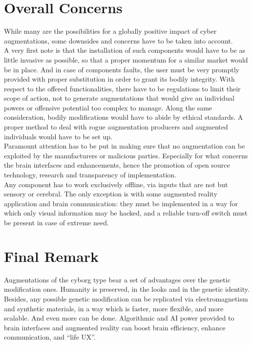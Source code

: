 \section*{Overall Concerns}
\label{sec:concerns}

While many are the possibilities for a globally positive impact of cyber augmentations, some downsides and concerns have to be taken into account.\\

A very first note is that the installation of such components would have to be as little invasive as possible, so that a proper momentum for a similar market would be in place. And in case of components faults, the user must be very promptly provided with proper substitution in order to grant its bodily integrity. With respect to the offered functionalities, there have to be regulations to limit their scope of action, not to generate augmentations that would give an individual powers or offensive potential too complex to manage. Along the same consideration, bodily modifications would have to abide by ethical standards. A proper method to deal with rogue augmentation producers and augmented individuals would have to be set up.\\

Paramount attention has to be put in making sure that no augmentation can be exploited by the manufacturers or malicious parties. Especially for what concerns the brain interfaces and enhancements, hence the promotion of open source technology, research and transparency of implementation.\\

Any component has to work exclusively offline, via inputs that are not but sensory or cerebral. The only exception is with some augmented reality application and brain communication: they must be implemented in a way for which only visual information may be hacked, and a reliable turn-off switch must be present in case of extreme need.

\section*{Final Remark}
\label{sec:remark}

Augmentations of the cyborg type bear a set of advantages over the genetic modification ones. Humanity is preserved, in the looks and in the genetic identity. Besides, any possible genetic modification can be replicated via electromagnetism and synthetic materials, in a way which is faster, more flexible, and more scalable. And even more can be done. Algorithmic and AI power provided to brain interfaces and augmented reality can boost brain efficiency, enhance communication, and “life UX”.\\

